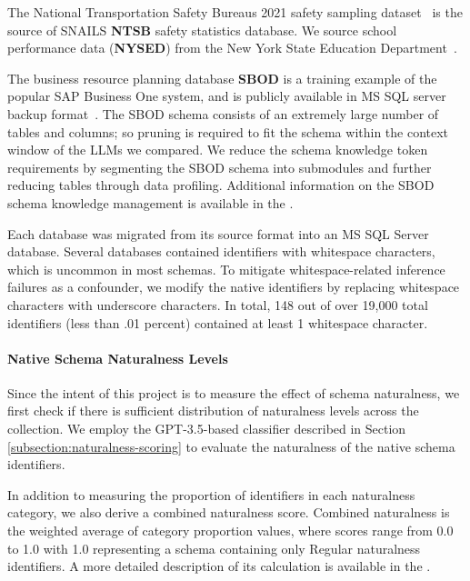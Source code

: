The National Transportation Safety Bureaus 2021 safety sampling dataset~\cite{ncsa2022overview, crash-investigation-sampling-system} is the source of SNAILS \textbf{NTSB} safety statistics database. 
We source school performance data (\textbf{NYSED}) from the New York State Education Department~\cite{nysed-report-card}. 

The business resource planning database \textbf{SBOD} is a training example of the popular SAP Business One system, and is publicly available in MS SQL server backup format~\cite{sap-demo}.
The SBOD schema consists of an extremely large number of tables and columns; so pruning is required to fit the schema within the context window of the LLMs we compared.
We reduce the schema knowledge token requirements by segmenting the SBOD schema into submodules and further reducing tables through data profiling.
Additional information on the SBOD schema knowledge management is available in the \fi.

Each database was migrated from its source format into an MS SQL Server database.
Several databases contained identifiers with whitespace characters, which is uncommon in most schemas.
To mitigate whitespace-related inference failures as a confounder, we modify the native identifiers by replacing whitespace characters with underscore characters.
In total, 148 out of over 19,000 total identifiers (less than .01 percent) contained at least 1 whitespace character.

\paragraph{\textbf{Native Schema Naturalness Levels}}

Since the intent of this project is to measure the effect of schema naturalness, we first check if there is sufficient distribution of naturalness levels across the collection. 
We employ the GPT-3.5-based classifier described in Section \ref{subsection:naturalness-scoring} to evaluate the naturalness of the native schema identifiers.

In addition to measuring the proportion of identifiers in each naturalness category, we also derive a combined naturalness score.
Combined naturalness is the weighted average of category proportion values, where scores range from 0.0 to 1.0 with 1.0 representing a schema containing only Regular naturalness identifiers.
A more detailed description of its calculation is available in the \fi.

